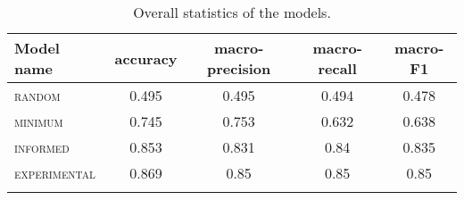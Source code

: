 \begin{table}
\begin{tabular}{lcccc}
	\lsptoprule
	Model name & accuracy %
	& macro-precision & macro-recall & macro-F1 \\ 
	\midrule
	\textsc{random} &  0.495 %
	& 0.495 & 0.494 & 0.478 \\ 
	\textsc{minimum} & 0.745 %
	& 0.753 & 0.632 & 0.638 \\ 
	\textsc{informed} & 0.853 %
	& 0.831 & 0.84 & 0.835 \\ 
	\textsc{experimental} & 0.869 %
	& 0.85 & 0.85 & 0.85 \\ 
	\lspbottomrule
\end{tabular}
\caption{Overall statistics of the models.} 
\label{tab:overalStat}
\end{table}
